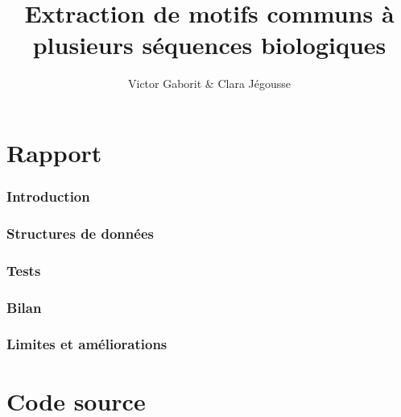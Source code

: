 \documentclass[11pt, oneside]{article}
\title{Extraction de motifs communs à plusieurs séquences biologiques}
\author{Victor Gaborit \& Clara Jégousse}
\date{}
\begin{document}

\maketitle

\setcounter{tocdepth}{3}
\tableofcontents

\part*{Rapport}

\section{Introduction} 

\section{Structures de données} 


\section{Tests}


\section{Bilan}


\section{Limites et améliorations}  

\part*{Code source}



\end{document}
